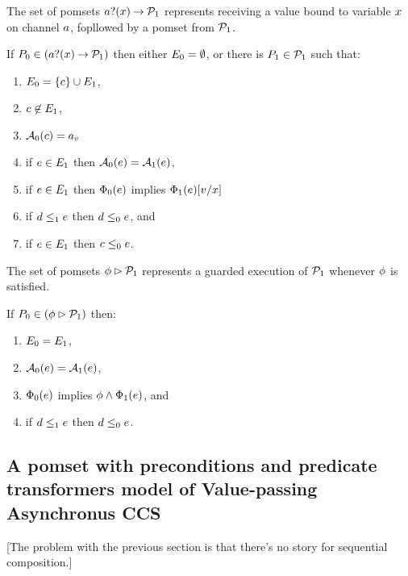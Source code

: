 The set of pomsets $\sRECV\aChan\aVar\sPREFIX\aPSS_1$ represents receiving a value bound to variable $x$ on channel $a$,
fopllowed by a pomset from $\mathcal{P}_1$.
\begin{definition}
  If $\aPS_0 \in (\sRECV\aChan\aVar\sPREFIX\aPSS_1)$ then either $E_0=\emptyset$, or there is $P_1\in\mathcal{P}_1$ such that:
  \begin{enumerate}
  \item $E_0 = \{c\} \cup E_1$,
  \item $c\not\in E_1$,
  \item $\mathcal{A}_0(c) = {a}_{v}$
  \item if $e\in E_1$ then $\mathcal{A}_0(e) = \mathcal{A}_1(e)$,
  \item if $e\in E_1$ then $\Phi_0(e)$ implies $\Phi_1(e)[v/x]$
  \item if $d\le_1e$ then $d\le_0e$, and
  \item if $e\in E_1$ then $c\le_0e$.
  \end{enumerate}
\end{definition}

The set of pomsets $\phi\mathbin\rhd\mathcal{P}_1$ represents a guarded execution of $\mathcal{P}_1$ whenever $\phi$ is satisfied.
\begin{definition}
  \label{defn:pomset-guard}
  If $P_0 \in (\phi\mathbin\rhd\mathcal{P}_1)$ then:
  \begin{enumerate}
  \item $E_0 = E_1$,
  \item $\mathcal{A}_0(e) = \mathcal{A}_1(e)$,
  \item $\Phi_0(e)$ implies $\phi\land\Phi_1(e)$, and
  \item if $d\le_1e$ then $d\le_0e$.
    \setcounter{pomsetGuardCount}{\value{enumi}}
  \end{enumerate}
\end{definition}

\subsection{A pomset with preconditions and predicate transformers model of Value-passing Asynchronus CCS}

[The problem with the previous section is that there's no story for sequential composition.]

